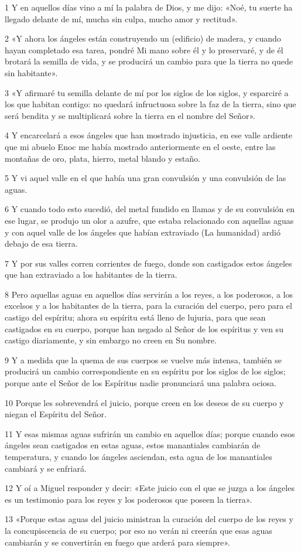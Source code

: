 \par 1 Y en aquellos días vino a mí la palabra de Dios, y me dijo: «Noé, tu suerte ha llegado delante de mí, mucha sin culpa, mucho amor y rectitud».
\par 2 «Y ahora los ángeles están construyendo un (edificio) de madera, y cuando hayan completado esa tarea, pondré Mi mano sobre él y lo preservaré, y de él brotará la semilla de vida, y se producirá un cambio para que la tierra no quede sin habitante».
\par 3 «Y afirmaré tu semilla delante de mí por los siglos de los siglos, y esparciré a los que habitan contigo: no quedará infructuosa sobre la faz de la tierra, sino que será bendita y se multiplicará sobre la tierra en el nombre del Señor».
\par 4 Y encarcelará a esos ángeles que han mostrado injusticia, en ese valle ardiente que mi abuelo Enoc me había mostrado anteriormente en el oeste, entre las montañas de oro, plata, hierro, metal blando y estaño.
\par 5 Y vi aquel valle en el que había una gran convulsión y una convulsión de las aguas.
\par 6 Y cuando todo esto sucedió, del metal fundido en llamas y de su convulsión en ese lugar, se produjo un olor a azufre, que estaba relacionado con aquellas aguas y con aquel valle de los ángeles que habían extraviado (La humanidad) ardió debajo de esa tierra.
\par 7 Y por sus valles corren corrientes de fuego, donde son castigados estos ángeles que han extraviado a los habitantes de la tierra.
\par 8 Pero aquellas aguas en aquellos días servirán a los reyes, a los poderosos, a los excelsos y a los habitantes de la tierra, para la curación del cuerpo, pero para el castigo del espíritu; ahora su espíritu está lleno de lujuria, para que sean castigados en su cuerpo, porque han negado al Señor de los espíritus y ven su castigo diariamente, y sin embargo no creen en Su nombre.
\par 9 Y a medida que la quema de sus cuerpos se vuelve más intensa, también se producirá un cambio correspondiente en su espíritu por los siglos de los siglos; porque ante el Señor de los Espíritus nadie pronunciará una palabra ociosa.
\par 10 Porque les sobrevendrá el juicio, porque creen en los deseos de su cuerpo y niegan el Espíritu del Señor.
\par 11 Y esas mismas aguas sufrirán un cambio en aquellos días; porque cuando esos ángeles sean castigados en estas aguas, estos manantiales cambiarán de temperatura, y cuando los ángeles asciendan, esta agua de los manantiales cambiará y se enfriará.
\par 12 Y oí a Miguel responder y decir: «Este juicio con el que se juzga a los ángeles es un testimonio para los reyes y los poderosos que poseen la tierra».
\par 13 «Porque estas aguas del juicio ministran la curación del cuerpo de los reyes y la concupiscencia de su cuerpo; por eso no verán ni creerán que esas aguas cambiarán y se convertirán en fuego que arderá para siempre».

